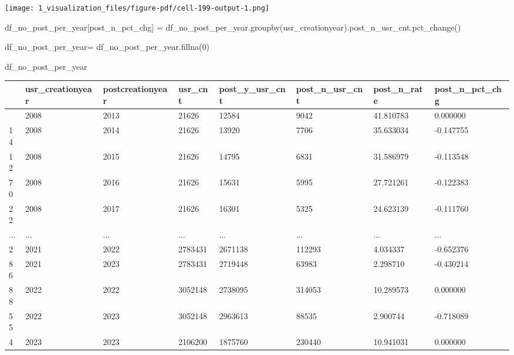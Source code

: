 \documentclass[
  letterpaper,
  DIV=11,
  numbers=noendperiod]{scrartcl}
\newenvironment{Shaded}{\begin{snugshade}}{\end{snugshade}}
\newcommand{\DecValTok}[1]{\textcolor[rgb]{0.68,0.00,0.00}{#1}}
\newcommand{\NormalTok}[1]{\textcolor[rgb]{0.00,0.23,0.31}{#1}}
\newcommand{\OperatorTok}[1]{\textcolor[rgb]{0.37,0.37,0.37}{#1}}
\newcommand{\StringTok}[1]{\textcolor[rgb]{0.13,0.47,0.30}{#1}}
\begin{document}
\texttt{[image: 1\_visualization\_files/figure-pdf/cell-199-output-1.png]}

\begin{Shaded}
\begin{Highlighting}[]
\NormalTok{df\_no\_post\_per\_year[}\StringTok{\textquotesingle{}post\_n\_pct\_chg\textquotesingle{}}\NormalTok{] }\OperatorTok{=}\NormalTok{ df\_no\_post\_per\_year.groupby(}\StringTok{\textquotesingle{}usr\_creationyear\textquotesingle{}}\NormalTok{).post\_n\_usr\_cnt.pct\_change()}
\end{Highlighting}
\end{Shaded}

\begin{Shaded}
\begin{Highlighting}[]
\NormalTok{df\_no\_post\_per\_year}\OperatorTok{=}\NormalTok{ df\_no\_post\_per\_year.fillna(}\DecValTok{0}\NormalTok{)}
\end{Highlighting}
\end{Shaded}

\begin{Shaded}
\begin{Highlighting}[]
\NormalTok{df\_no\_post\_per\_year}
\end{Highlighting}
\end{Shaded}

\begin{longtable}[]{@{}llllllll@{}}
\toprule\noalign{}
& usr\_creationyear & postcreationyear & usr\_cnt & post\_y\_usr\_cnt &
post\_n\_usr\_cnt & post\_n\_rate & post\_n\_pct\_chg \\
\midrule\noalign{}
\endhead
\bottomrule\noalign{}
\endlastfoot
11 & 2008 & 2013 & 21626 & 12584 & 9042 & 41.810783 & 0.000000 \\
14 & 2008 & 2014 & 21626 & 13920 & 7706 & 35.633034 & -0.147755 \\
12 & 2008 & 2015 & 21626 & 14795 & 6831 & 31.586979 & -0.113548 \\
70 & 2008 & 2016 & 21626 & 15631 & 5995 & 27.721261 & -0.122383 \\
22 & 2008 & 2017 & 21626 & 16301 & 5325 & 24.623139 & -0.111760 \\
... & ... & ... & ... & ... & ... & ... & ... \\
2 & 2021 & 2022 & 2783431 & 2671138 & 112293 & 4.034337 & -0.652376 \\
86 & 2021 & 2023 & 2783431 & 2719448 & 63983 & 2.298710 & -0.430214 \\
88 & 2022 & 2022 & 3052148 & 2738095 & 314053 & 10.289573 & 0.000000 \\
55 & 2022 & 2023 & 3052148 & 2963613 & 88535 & 2.900744 & -0.718089 \\
4 & 2023 & 2023 & 2106200 & 1875760 & 230440 & 10.941031 & 0.000000 \\
\end{longtable}
\end{document}
